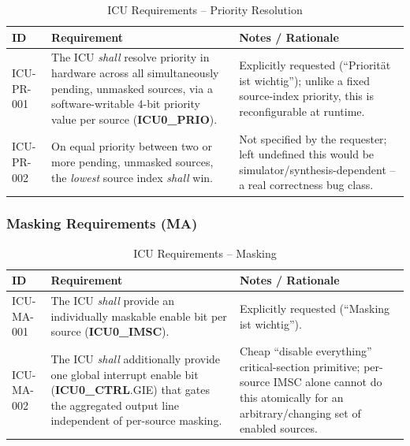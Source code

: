 \begin{table}[H]
\caption{ICU Requirements -- Priority Resolution}
\label{tab:asIcuReqPR}
\centering
\begin{tabularx}{\textwidth}{|l |X |X|}
  \hline
  ID & Requirement & Notes / Rationale \\
  \hline
  \hline
  ICU-PR-001 &
    The ICU \textit{shall} resolve priority in hardware across all
    simultaneously pending, unmasked sources, via a software-writable
    4-bit priority value per source (\textbf{ICU0\_PRIO}). &
    Explicitly requested (``Priorit\"at ist wichtig''); unlike a fixed
    source-index priority, this is reconfigurable at runtime. \\
  \hline
  ICU-PR-002 &
    On equal priority between two or more pending, unmasked sources, the
    \textit{lowest} source index \textit{shall} win. &
    Not specified by the requester; left undefined this would be
    simulator/synthesis-dependent -- a real correctness bug class. \\
  \hline
\end{tabularx}
\end{table}

\subsubsection{Masking Requirements (MA)}

\begin{table}[H]
\caption{ICU Requirements -- Masking}
\label{tab:asIcuReqMA}
\centering
\begin{tabularx}{\textwidth}{|l |X |X|}
  \hline
  ID & Requirement & Notes / Rationale \\
  \hline
  \hline
  ICU-MA-001 &
    The ICU \textit{shall} provide an individually maskable enable bit per
    source (\textbf{ICU0\_IMSC}). &
    Explicitly requested (``Masking ist wichtig''). \\
  \hline
  ICU-MA-002 &
    The ICU \textit{shall} additionally provide one global interrupt
    enable bit (\textbf{ICU0\_CTRL}.GIE) that gates the aggregated output
    line independent of per-source masking. &
    Cheap ``disable everything'' critical-section primitive; per-source
    IMSC alone cannot do this atomically for an arbitrary/changing set of
    enabled sources. \\
  \hline
\end{tabularx}
\end{table}


